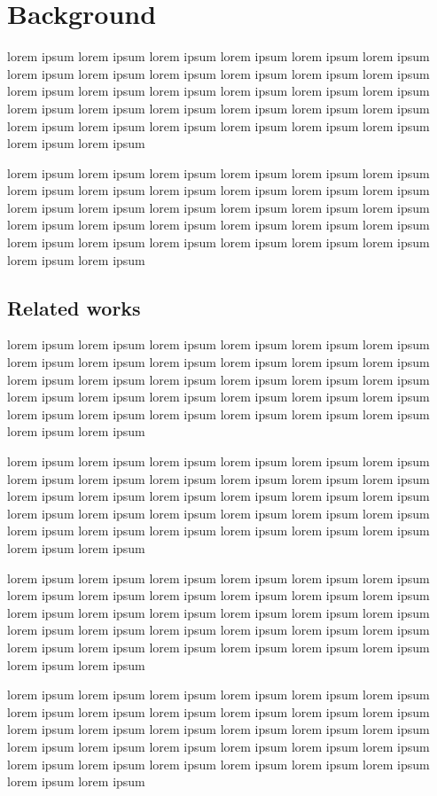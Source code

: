 \documentclass[12pt,oneside]{report}
\begin{document}
\section{Background}

lorem ipsum lorem ipsum lorem ipsum lorem ipsum lorem ipsum lorem ipsum lorem
ipsum lorem ipsum lorem ipsum lorem ipsum lorem ipsum lorem ipsum lorem ipsum
lorem ipsum lorem ipsum lorem ipsum lorem ipsum lorem ipsum lorem ipsum lorem
ipsum lorem ipsum lorem ipsum lorem ipsum lorem ipsum lorem ipsum lorem ipsum
lorem ipsum lorem ipsum lorem ipsum lorem ipsum lorem ipsum lorem ipsum

lorem ipsum lorem ipsum lorem ipsum lorem ipsum lorem ipsum lorem ipsum lorem
ipsum lorem ipsum lorem ipsum lorem ipsum lorem ipsum lorem ipsum lorem ipsum
lorem ipsum lorem ipsum lorem ipsum lorem ipsum lorem ipsum lorem ipsum lorem
ipsum lorem ipsum lorem ipsum lorem ipsum lorem ipsum lorem ipsum lorem ipsum
lorem ipsum lorem ipsum lorem ipsum lorem ipsum lorem ipsum lorem ipsum

\subsection{Related works}

lorem ipsum lorem ipsum lorem ipsum lorem ipsum lorem ipsum lorem ipsum lorem
ipsum lorem ipsum lorem ipsum lorem ipsum lorem ipsum lorem ipsum lorem ipsum
lorem ipsum lorem ipsum lorem ipsum lorem ipsum lorem ipsum lorem ipsum lorem
ipsum lorem ipsum lorem ipsum lorem ipsum lorem ipsum lorem ipsum lorem ipsum
lorem ipsum lorem ipsum lorem ipsum lorem ipsum lorem ipsum lorem ipsum

lorem ipsum lorem ipsum lorem ipsum lorem ipsum lorem ipsum lorem ipsum lorem
ipsum lorem ipsum lorem ipsum lorem ipsum lorem ipsum lorem ipsum lorem ipsum
lorem ipsum lorem ipsum lorem ipsum lorem ipsum lorem ipsum lorem ipsum lorem
ipsum lorem ipsum lorem ipsum lorem ipsum lorem ipsum lorem ipsum lorem ipsum
lorem ipsum lorem ipsum lorem ipsum lorem ipsum lorem ipsum lorem ipsum

lorem ipsum lorem ipsum lorem ipsum lorem ipsum lorem ipsum lorem ipsum lorem
ipsum lorem ipsum lorem ipsum lorem ipsum lorem ipsum lorem ipsum lorem ipsum
lorem ipsum lorem ipsum lorem ipsum lorem ipsum lorem ipsum lorem ipsum lorem
ipsum lorem ipsum lorem ipsum lorem ipsum lorem ipsum lorem ipsum lorem ipsum
lorem ipsum lorem ipsum lorem ipsum lorem ipsum lorem ipsum lorem ipsum

lorem ipsum lorem ipsum lorem ipsum lorem ipsum lorem ipsum lorem ipsum lorem
ipsum lorem ipsum lorem ipsum lorem ipsum lorem ipsum lorem ipsum lorem ipsum
lorem ipsum lorem ipsum lorem ipsum lorem ipsum lorem ipsum lorem ipsum lorem
ipsum lorem ipsum lorem ipsum lorem ipsum lorem ipsum lorem ipsum lorem ipsum
lorem ipsum lorem ipsum lorem ipsum lorem ipsum lorem ipsum lorem ipsum
\cleardoublepage
\end{document}
